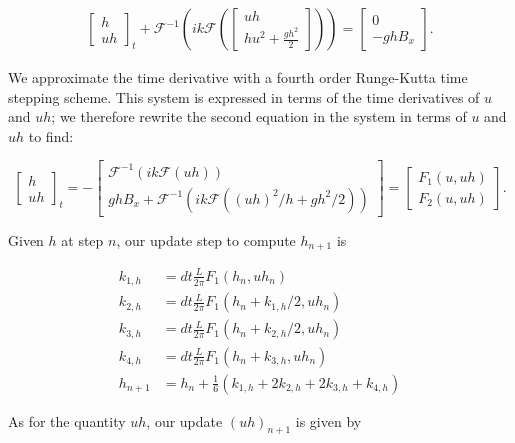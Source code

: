\begin{align*}
    \begin{bmatrix}
        h\\
        uh
    \end{bmatrix}_t
    + 
    \mathcal{F}^{-1}\left(ik\mathcal{F}\left(\begin{bmatrix}
        uh\\
        hu^2 + \frac{gh^2}{2}
    \end{bmatrix} \right)\right)
    = 
    \begin{bmatrix}
        0\\
        -ghB_x
    \end{bmatrix}.
\end{align*}

We approximate the time derivative with a fourth order Runge-Kutta time stepping scheme. This system is expressed in 
terms of the time derivatives of $u$ and $uh$; we therefore rewrite the second equation in the system in 
terms of $u$ and $uh$ to find:

$$
\renewcommand*{\arraystretch}{1.5}
\begin{bmatrix}
    h\\
    uh
\end{bmatrix}_t = -\begin{bmatrix}
    \mathcal{F}^{-1}(ik\mathcal{F}(uh))\\
    ghB_x + \mathcal{F}^{-1}(ik\mathcal{F}((uh)^2/h + gh^2/2)) 
\end{bmatrix} = \begin{bmatrix}
    F_1(u,uh)\\
    F_2(u,uh)
\end{bmatrix}.
$$

\noindent Given $h$ at step $n$, our update step to compute $h_{n+1}$ is

\begin{align*}
    k_{1,h} &= dt\frac{L}{2\pi}F_1(h_n, uh_n)\\
    k_{2,h} &= dt\frac{L}{2\pi}F_1(h_n + k_{1,h}/2, uh_n)\\
    k_{3,h} &= dt\frac{L}{2\pi}F_1(h_n + k_{2,h}/2, uh_n)\\
    k_{4,h} &= dt\frac{L}{2\pi}F_1(h_n + k_{3,h}, uh_n)\\
    h_{n+1} &= h_n + \frac{1}{6}(k_{1,h} + 2k_{2,h} + 2k_{3,h} + k_{4,h})
\end{align*}

\noindent As for the quantity $uh$, our update $(uh)_{n+1}$ is given by

